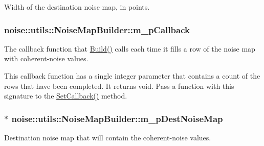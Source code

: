 Width of the destination noise map, in points. 

\hypertarget{classnoise_1_1utils_1_1_noise_map_builder_adf2a8d0f463ba83c0efabffc83b0074c}{
\subsubsection[{m\+\_\+p\+Callback}]{ noise\+::utils\+::\+Noise\+Map\+Builder\+::m\+\_\+p\+Callback\hspace{0.3cm}{\ttfamily [protected]}}}\label{classnoise_1_1utils_1_1_noise_map_builder_adf2a8d0f463ba83c0efabffc83b0074c}
The callback function that \hyperlink{classnoise_1_1utils_1_1_noise_map_builder_abe0e5f01c696c2290792c8f8736e3ed1}{Build()} calls each time it fills a row of the noise map with coherent-\/noise values.

This callback function has a single integer parameter that contains a count of the rows that have been completed. It returns void. Pass a function with this signature to the \hyperlink{classnoise_1_1utils_1_1_noise_map_builder_ac760187423eb5e16ac015f9beafd78ea}{Set\+Callback()} method. \hypertarget{classnoise_1_1utils_1_1_noise_map_builder_a6de6a3c7781f2823b10057d6a657b631}{
\subsubsection[{m\+\_\+p\+Dest\+Noise\+Map}]{ $\ast$ noise\+::utils\+::\+Noise\+Map\+Builder\+::m\+\_\+p\+Dest\+Noise\+Map\hspace{0.3cm}{\ttfamily [protected]}}}\label{classnoise_1_1utils_1_1_noise_map_builder_a6de6a3c7781f2823b10057d6a657b631}


Destination noise map that will contain the coherent-\/noise values. 

